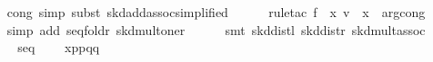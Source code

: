 \begin{isabellebody}
\ \ \ \ \isamarkupfalse%
\ {}cong{}\ simp{}\ subst\ skd{}add{}assoc{}simplified{}{}\isanewline
\ \ \ \ \isamarkupfalse%
\ {}rule{}tac\ f\ {}\ {}{}x{}\ {}{}v\ {}\ x{}\ \ arg{}cong{}\isanewline
\ \ \ \ \isamarkupfalse%
\ {}simp\ add{}\ seq{}foldr\ skd{}mult{}oner{}\isanewline
\ \ \ \ \isamarkupfalse%
\ {}smt\ skd{}distl\ skd{}distr\ skd{}mult{}assoc{}\isanewline
\isanewline
\ \ \isamarkupfalse%
\ \isamarkupfalse%
\ {}{}{}{}\ {}\ seq\isanewline
\ \ \ \ {}x{}{}p{}{}{}p{}{}{}q{}{}{}{}q{}{}{}\isanewline

\end{isabellebody}
